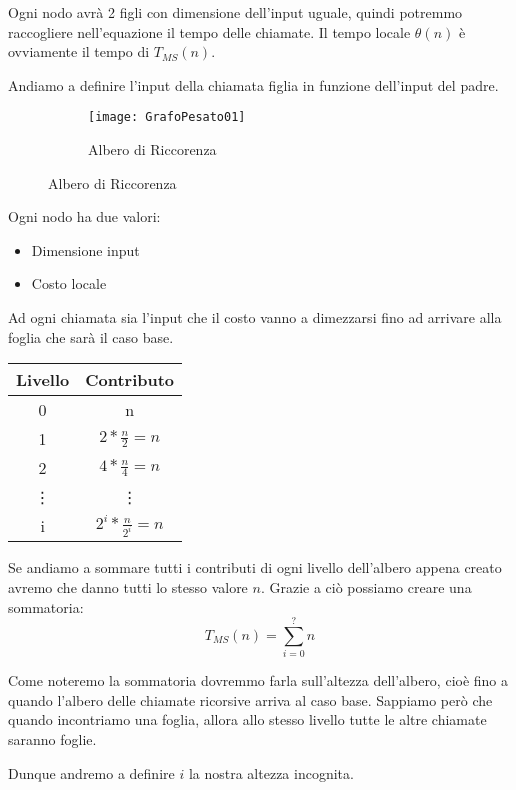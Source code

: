 Ogni nodo avrà 2 figli con dimensione dell'input uguale, quindi potremmo raccogliere nell'equazione il tempo delle chiamate. Il tempo locale $\theta(n)$ è ovviamente il tempo di $T_{MS}(n)$.

Andiamo a definire l'input della chiamata figlia in funzione dell'input del padre.\smallskip

\begin{figure}[H]
	\centering
	\begin{subfigure}[b]{0.25\textwidth}
		\texttt{[image: GrafoPesato01]} 
		\caption{Albero di Riccorenza}
	\end{subfigure}
\end{figure} 

Ogni nodo ha due valori:
\begin{itemize}
    \item Dimensione input
    \item Costo locale
\end{itemize}
Ad ogni chiamata sia l'input che il costo vanno a dimezzarsi fino ad arrivare alla foglia che sarà il caso base.

\begin{center}
    \begin{tabular}{||c c||} 
     \hline
     Livello & Contributo \\ [0.5ex] 
     \hline\hline
     0 & n  \\ 
     \hline
     1 & $2*\frac{n}{2} = n$  \\
     \hline
     2 & $4*\frac{n}{4} = n$  \\
     \hline
     \vdots & \vdots \\
     \hline
     i & $2^i*\frac{n}{2^i} = n$ \\ [1ex] 
     \hline
    \end{tabular}
\end{center}



Se andiamo a sommare tutti i contributi di ogni livello dell'albero appena creato avremo che danno tutti lo stesso valore $n$. Grazie a ciò possiamo creare una sommatoria:
$$ T_{MS}(n)=\sum_{i=0}^{?} n$$

Come noteremo la sommatoria dovremmo farla sull'altezza dell'albero, cioè fino a quando l'albero delle chiamate ricorsive arriva al caso base. Sappiamo però che quando incontriamo una foglia, allora allo stesso livello tutte le altre chiamate saranno foglie.\smallskip

Dunque andremo a definire $i$ la nostra altezza incognita.\smallskip

